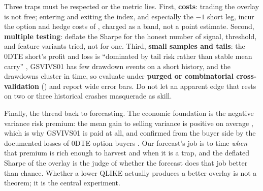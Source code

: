\begin{warning}
Three traps must be respected or the metric lies. First, \textbf{costs}: trading the overlay is not free; entering and exiting the index, and especially the $-1$ short leg, incur the option and hedge costs of , charged as a band, not a point estimate. Second, \textbf{multiple testing}: deflate the Sharpe for the honest number of signal, threshold, and feature variants tried, not for one. Third, \textbf{small samples and tails}: the 0DTE short's profit and loss is ``dominated by tail risk rather than stable mean carry'' \citep{Vilkov2024}, GSVIVS01 has few drawdown events on a short history, and the drawdowns cluster in time, so evaluate under \textbf{purged or combinatorial cross-validation} () and report wide error bars. Do not let an apparent edge that rests on two or three historical crashes masquerade as skill.
\end{warning}

Finally, the thread back to forecasting. The economic foundation is the negative variance risk premium: the mean gain to selling variance is positive on average \citep{BakshiKapadia2003}, which is why GSVIVS01 is paid at all, and confirmed from the buyer side by the documented losses of 0DTE option buyers \citep{BeckmeyerBrangerGayda2023}. Our forecast's job is to time \emph{when} that premium is rich enough to harvest and when it is a trap, and the deflated Sharpe of the overlay is the judge of whether the forecast does that job better than chance. Whether a lower QLIKE actually produces a better overlay is not a theorem; it is the central experiment.

